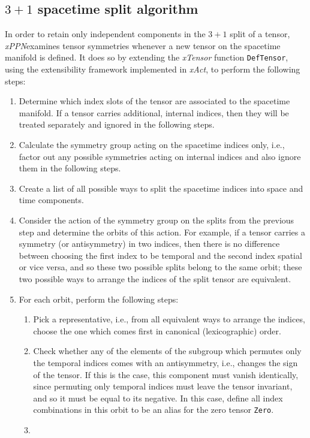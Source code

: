 \documentclass[notitlepage,a4paper,aps,prd,onecolumn,superscriptaddress,nofootinbib,groupedaddress,longbibliography]{revtex4-1}
\newcommand{\xPPN}{\emph{xPPN}}
\newcommand{\xAct}{\emph{xAct}}
\newcommand{\xTensor}{\emph{xTensor}}
\begin{document}
\subsection{$3+1$ spacetime split algorithm}\label{app:31algo}
In order to retain only independent components in the $3+1$ split of a tensor, \xPPN examines tensor symmetries whenever a new tensor on the spacetime manifold is defined. It does so by extending the \xTensor{} function \lstinline/DefTensor/, using the extensibility framework implemented in \xAct, to perform the following steps:
\begin{enumerate}
\item
Determine which index slots of the tensor are associated to the spacetime manifold. If a tensor carries additional, internal indices, then they will be treated separately and ignored in the following steps.
\item
Calculate the symmetry group acting on the spacetime indices only, i.e., factor out any possible symmetries acting on internal indices and also ignore them in the following steps.
\item
Create a list of all possible ways to split the spacetime indices into space and time components.
\item
Consider the action of the symmetry group on the splits from the previous step and determine the orbits of this action. For example, if a tensor carries a symmetry (or antisymmetry) in two indices, then there is no difference between choosing the first index to be temporal and the second index spatial or vice versa, and so these two possible splits belong to the same orbit; these two possible ways to arrange the indices of the split tensor are equivalent.
\item
For each orbit, perform the following steps:
\begin{enumerate}
\item
Pick a representative, i.e., from all equivalent ways to arrange the indices, choose the one which comes first in canonical (lexicographic) order.
\item
Check whether any of the elements of the subgroup which permutes only the temporal indices comes with an antisymmetry, i.e., changes the sign of the tensor. If this is the case, this component must vanish identically, since permuting only temporal indices must leave the tensor invariant, and so it must be equal to its negative. In this case, define all index combinations in this orbit to be an alias for the zero tensor \lstinline/Zero/.
\item

\end{enumerate}
\end{enumerate}
\end{document}
